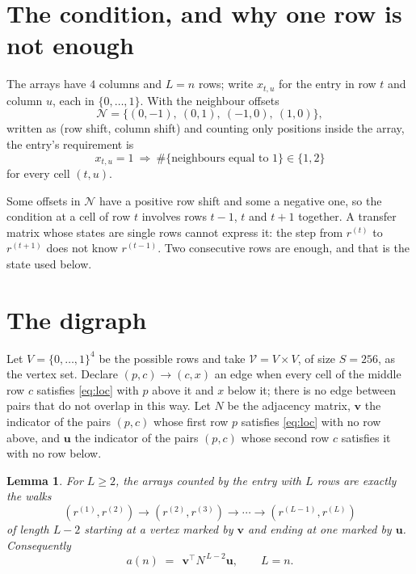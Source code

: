 \documentclass[11pt,a4paper]{article}
\theoremstyle{plain}
\newtheorem{lemma}[theorem]{Lemma}
\theoremstyle{definition}
\begin{document}
\section{The condition, and why one row is not enough}

The arrays have $4$ columns and $L=n$ rows; write $x_{t,u}$ for the entry in
row $t$ and column $u$, each in $\{0,\dots,1\}$. With the neighbour offsets
\[
\mathcal N=\{(0,-1),\ (0,1),\ (-1,0),\ (1,0)\},
\]
written as (row shift, column shift) and counting only positions inside the array, the
entry's requirement is
\begin{equation}\label{eq:loc}
x_{t,u}=1\ \Rightarrow\ \#\{\text{neighbours equal to }1\}\in\{1,2\}
\end{equation}
for every cell $(t,u)$.

Some offsets in $\mathcal N$ have a positive row shift and some a negative one, so the
condition at a cell of row $t$ involves rows $t-1$, $t$ and $t+1$ together. A transfer
matrix whose states are single rows cannot express it: the step from $r^{(t)}$ to
$r^{(t+1)}$ does not know $r^{(t-1)}$. Two consecutive rows are enough, and that is
the state used below.

\section{The digraph}

Let $V=\{0,\dots,1\}^{4}$ be the possible rows and take
$\mathcal V=V\times V$, of size $S=256$, as the vertex set. Declare $(p,c)\to(c,x)$ an edge
when every cell of the middle row $c$ satisfies \eqref{eq:loc} with $p$ above it and $x$
below it; there is no edge between pairs that do not overlap in this way. Let $N$ be the
adjacency matrix, $\mathbf{v}$ the indicator of the pairs $(p,c)$ whose first row $p$
satisfies \eqref{eq:loc} with no row above, and $\mathbf{u}$ the indicator of
the pairs $(p,c)$ whose second row $c$ satisfies it with no row below.

\begin{lemma}\label{lem:walk}
For $L\ge2$, the arrays counted by the entry with $L$ rows are exactly the walks
\[
(r^{(1)},r^{(2)})\to(r^{(2)},r^{(3)})\to\cdots\to(r^{(L-1)},r^{(L)})
\]
of length $L-2$ starting at a vertex marked by $\mathbf{v}$ and ending at one marked by
$\mathbf{u}$. Consequently
\[
a(n)\;=\;\,\mathbf{v}^{\!\top}N^{\,L-2}\mathbf{u},\qquad L=n .
\]
\end{lemma}
\end{document}
